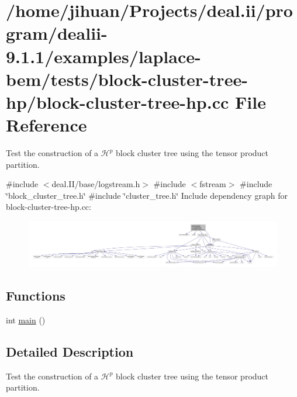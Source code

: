 \hypertarget{block-cluster-tree-hp_8cc}{}\section{/home/jihuan/\+Projects/deal.ii/program/dealii-\/9.1.1/examples/laplace-\/bem/tests/block-\/cluster-\/tree-\/hp/block-\/cluster-\/tree-\/hp.cc File Reference}
\label{block-cluster-tree-hp_8cc}


Test the construction of a $\mathcal{H}^p$ block cluster tree using the tensor product partition.  


{\ttfamily \#include $<$deal.\+I\+I/base/logstream.\+h$>$}\newline
{\ttfamily \#include $<$fstream$>$}\newline
{\ttfamily \#include \char`\"{}block\+\_\+cluster\+\_\+tree.\+h\char`\"{}}\newline
{\ttfamily \#include \char`\"{}cluster\+\_\+tree.\+h\char`\"{}}\newline
Include dependency graph for block-\/cluster-\/tree-\/hp.cc\+:\nopagebreak
\begin{figure}[H]
\begin{center}
\leavevmode
\includegraphics[width=350pt]{block-cluster-tree-hp_8cc__incl}
\end{center}
\end{figure}
\subsection*{Functions}
\begin{DoxyCompactItemize}
\item 
int \hyperlink{block-cluster-tree-hp_8cc_ae66f6b31b5ad750f1fe042a706a4e3d4}{main} ()
\end{DoxyCompactItemize}


\subsection{Detailed Description}
Test the construction of a $\mathcal{H}^p$ block cluster tree using the tensor product partition. 


